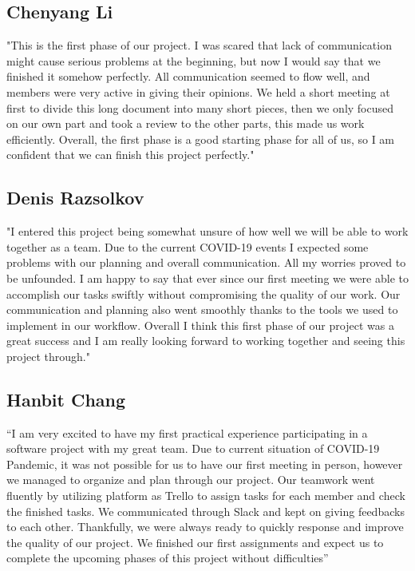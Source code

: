 \documentclass{article}
\begin{document}
\subsection{Chenyang Li}
"This is the first phase of our project. I was scared that lack of communication might cause serious problems at the beginning, but now I would say that we finished it somehow perfectly. All communication seemed to flow well, and members were very active in giving their opinions. We held a short meeting at first to divide this long document into many short pieces, then we only focused on our own part and took a review to the other parts, this made us work efficiently. Overall, the first phase is a good starting phase for all of us, so I am confident that we can finish this project perfectly."

\subsection{Denis Razsolkov}
"I entered this project being somewhat unsure of how well we will be able to work together as a team. Due to the current COVID-19 events I expected some problems with our planning and overall communication. All my worries proved to be unfounded. I am happy to say that ever since our first meeting we were able to accomplish our tasks swiftly without compromising the quality of our work. Our communication and planning also went smoothly thanks to the tools we used to implement in our workflow. Overall I think this first phase of our project was a great success and I am really looking forward to working together and seeing this project through."

\subsection{Hanbit Chang}
“I am very excited to have my first practical experience participating in a software project with my great team. Due to current situation of COVID-19 Pandemic, it was not possible for us to have our first meeting in person, however we managed to organize and plan through our project. Our teamwork went fluently by utilizing platform as Trello to assign tasks for each member and check the finished tasks. We communicated through Slack and kept on giving feedbacks to each other. Thankfully, we were always ready to quickly response and improve the quality of our project. We finished our first assignments and expect us to complete the upcoming phases of this project without difficulties”
\end{document}
